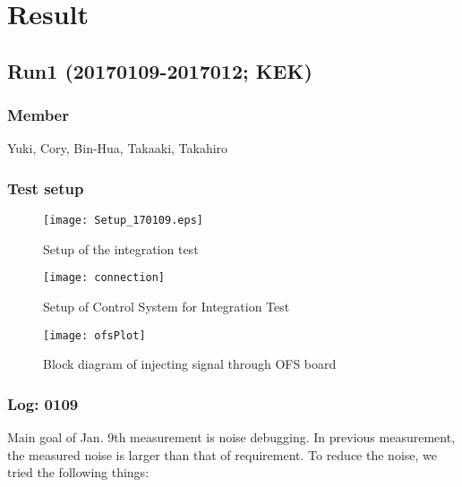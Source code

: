 
\chapter{Result} %

\label{Chapter2} %


\section{Run1 (20170109-2017012; KEK)}
\subsection{Member}
Yuki, Cory, Bin-Hua, Takaaki, Takahiro
\subsection{Test setup}
\begin{figure}
	\begin{center}
                 \texttt{[image: Setup\_170109.eps]}
                 \caption{Setup of the integration test} 
                 \label{fig:Setup} 
	\end{center}
\end{figure}
\begin{figure}
	\begin{center}
                 \texttt{[image: connection]}
                 \caption{Setup of Control System for Integration Test} 
	\end{center}
\end{figure}
\begin{figure}
	\begin{center}
                 \texttt{[image: ofsPlot]}
                 \caption{Block diagram of injecting signal through OFS board} 
	\end{center}
\end{figure}
\pagebreak
\subsection{Log: 01\/09}
Main goal of Jan. 9th measurement is noise debugging.
In previous measurement, the measured noise is larger than that of requirement.
To reduce the noise, we tried the following things:
